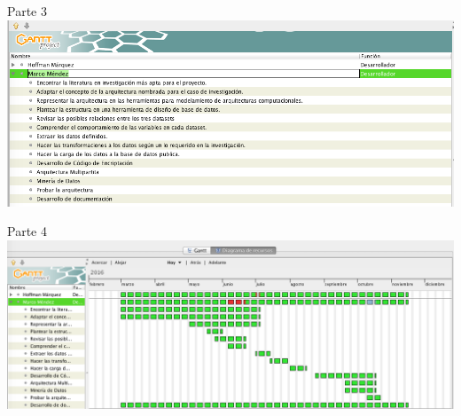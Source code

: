 \documentclass[a4paper, 11pt, oneside]{article}
\theoremstyle{definition}
\theoremstyle{remark}
\begin{document}
\begin{table}
\begin{center}
Parte 3
\includegraphics[width=\textwidth]{Marco1.png}
\end{center}
\end{table}
\clearpage

\begin{table}
\begin{center}
Parte 4
\includegraphics[width=\textwidth]{Marco2.png}
\end{center}
\end{table}
\clearpage

\clearpage



\end{document}
